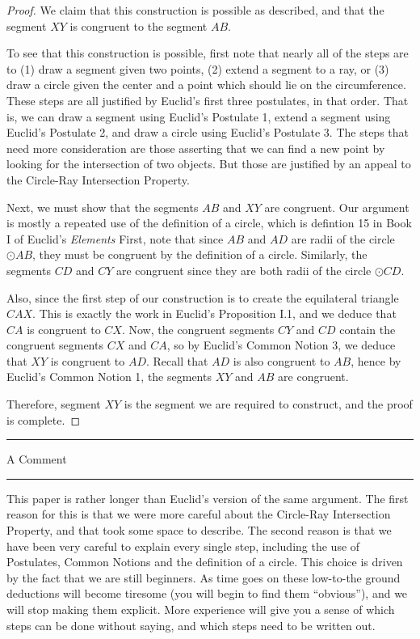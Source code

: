 \documentclass[12pt]{article}
\begin{document}
\begin{proof}
We claim that this construction is possible as described, and that the segment $XY$ is congruent to the segment $AB$. 

To see that this construction is possible, first note that nearly all of the steps are to (1) draw a segment given two points, (2) extend a segment to a ray, or (3) draw a circle given the center and a point which should lie on the circumference. These steps are all justified by Euclid's first three postulates, in that order. That is, we can draw a segment using Euclid's Postulate 1, extend a segment using Euclid's Postulate 2, and draw a circle using Euclid's Postulate 3. The steps that need more consideration are those asserting that we can find a new point by looking for the intersection of two objects. But those are justified by an appeal to the Circle-Ray Intersection Property.

Next, we must show that the segments $AB$ and $XY$ are congruent. Our argument is mostly a repeated use of the definition of a circle, which is defintion 15 in Book I of Euclid's \emph{Elements}
First, note that since $AB$ and $AD$ are radii of the circle $\odot AB$, they must be congruent by the definition of a circle. Similarly, the segments $CD$ and $CY$ are congruent since they are both radii of the circle $\odot CD$.

Also, since the first step of our construction is to create the equilateral triangle $CAX$. This is exactly the work in Euclid's Proposition I.1, and we deduce that $CA$ is congruent to $CX$. Now, the congruent segments $CY$ and $CD$ contain the congruent segments $CX$ and $CA$, so by Euclid's Common Notion 3, we deduce that $XY$ is congruent to $AD$. Recall that $AD$ is also congruent to $AB$, hence by Euclid's Common Notion 1, the segments $XY$ and $AB$ are congruent.

Therefore, segment $XY$ is the segment we are required to construct, and the proof is complete.
\end{proof}

\vspace{1in}

\hrule

\begin{center}
A Comment
\end{center}

\hrule

\vspace{0.25in}

This paper is rather longer than Euclid's version of the same argument. The first reason for this is that we were more careful about the Circle-Ray Intersection Property, and that took some space to describe. The second reason is that we have been very careful to explain every single step, including the use of Postulates, Common Notions and the definition of a circle. This choice is driven by the fact that we are still beginners. As time goes on these low-to-the ground deductions will become tiresome (you will begin to find them ``obvious''), and we will stop making them explicit. More experience will give you a sense of which steps can be done without saying, and which steps need to be written out.
 
\end{document}
